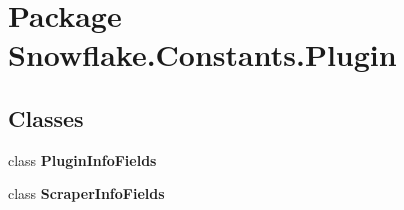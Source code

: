 \hypertarget{namespace_snowflake_1_1_constants_1_1_plugin}{}\section{Package Snowflake.\+Constants.\+Plugin}
\label{namespace_snowflake_1_1_constants_1_1_plugin}
\subsection*{Classes}
\begin{DoxyCompactItemize}
\item 
class {\bfseries Plugin\+Info\+Fields}
\item 
class {\bfseries Scraper\+Info\+Fields}
\end{DoxyCompactItemize}
